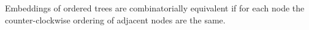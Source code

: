 \documentclass[10pt]{CSUNthesis}
\theoremstyle{plain}%
\theoremstyle{definition}
\theoremstyle{remark}
\newcommand{\HH}{{\mathcal{H}}} %
\renewcommand{\PP}{{\mathcal{P}}} %
\renewcommand{\it}[1]{{\textit{#1}}}
\newcommand{\rn}[1]{\lowercase\expandafter{(\romannumeral #1\relax)}}
\begin{document}
Embeddings of ordered trees are combinatorially equivalent if for each node the counter-clockwise ordering of adjacent nodes are the same. 




\end{document}
